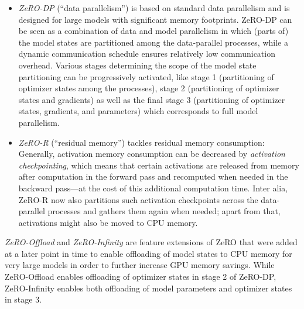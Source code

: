 \begin{itemize}
    \item \textit{ZeRO-DP} (\enquote{data parallelism}) is based on standard
          data parallelism and is designed for large models with significant
          memory footprints. ZeRO-DP can be seen as a combination of data and model
          parallelism in which (parts of) the model states are partitioned
          among the data-parallel processes, while a dynamic communication
          schedule ensures relatively low communication overhead. Various stages
          determining the scope of the model state partitioning can be progressively
          activated, like stage 1 (partitioning of optimizer states among the processes), 
          stage 2 (partitioning of optimizer states and gradients) as well as 
          the final stage 3 (partitioning of optimizer states, gradients, and 
          parameters) which corresponds to full model parallelism.
    \item \textit{ZeRO-R} (\enquote{residual memory}) tackles residual memory consumption: 
          Generally, activation memory consumption can be decreased by 
          \textit{activation checkpointing}, which means that certain activations
          are released from memory after computation in the forward pass and
          recomputed when needed in the backward pass---at the cost of this additional
          computation time. Inter alia, ZeRO-R now also partitions such activation 
          checkpoints across the data-parallel processes and gathers them again when 
          needed; apart from that, activations might also be moved to CPU memory. 
\end{itemize}

\textit{ZeRO-Offload} \cite{DBLP:journals/corr/abs-2101-06840} and 
\textit{ZeRO-Infinity} \cite{DBLP:journals/corr/abs-2104-07857} are feature extensions of ZeRO
that were added at a later point in time to enable offloading of model states to CPU memory 
for very large models in order to further increase GPU memory savings. While ZeRO-Offload 
enables offloading of optimizer states in stage 2 of ZeRO-DP, ZeRO-Infinity
enables both offloading of model parameters and optimizer states in stage 3.